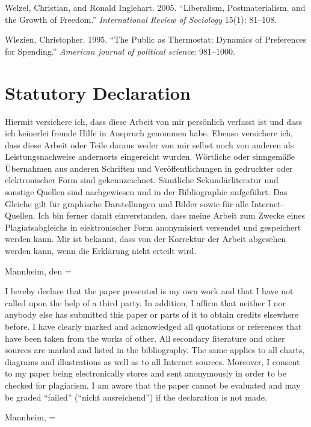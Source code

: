 \documentclass[12pt,english,a4paper,oneside]{article}
\newlength{\cslhangindent}
\newlength{\cslentryspacingunit} %
\newenvironment{CSLReferences}[2] %
 {%
  \setlength{\parindent}{0pt}
  \ifodd #1
  \let\oldpar\par
  \def\par{\hangindent=\cslhangindent\oldpar}
  \fi
  \setlength{\parskip}{#2\cslentryspacingunit}
 }%
 {}
\newcommand*{\SignatureAndDate}[1]{%
\vspace{2cm}
     Mannheim, den \makebox[2cm]{\hrulefill} \hfill\makebox[9cm]{\hrulefill}%
     \par
  \hfill\makebox[7.5cm][t]{Name und Unterschrift}
  \vspace{2cm}
}%
\newcommand*{\SignatureAndDateEng}[1]{%
\vspace{2cm}
     Mannheim, \makebox[2cm]{\hrulefill} \hfill\makebox[9cm]{\hrulefill}%
     \par
    \hfill\makebox[7.5cm][t]{Name and Signature}%
\vspace{2cm}
}%
\theoremstyle{definition}
\theoremstyle{definition}
\theoremstyle{definition}
\theoremstyle{definition}
\theoremstyle{remark}
\begin{document}
\begin{CSLReferences}{1}{0}
\leavevmode{}%
Welzel, Christian, and Ronald Inglehart. 2005. {``Liberalism, Postmaterialism, and the Growth of Freedom.''} \emph{International Review of Sociology} 15(1): 81--108.

\leavevmode{}%
Wlezien, Christopher. 1995. {``The Public as Thermostat: Dynamics of Preferences for Spending.''} \emph{American journal of political science}: 981--1000.

\end{CSLReferences}

\clearpage

\hypertarget{statutory-declaration}{%
\section*{Statutory Declaration}\label{statutory-declaration}}

Hiermit versichere ich, dass diese Arbeit von mir persönlich verfasst ist und dass ich keinerlei fremde Hilfe in Anspruch genommen habe.
Ebenso versichere ich, dass diese Arbeit oder Teile daraus weder von mir selbst noch von anderen als Leistungsnachweise andernorts eingereicht wurden.
Wörtliche oder sinngemäße Übernahmen aus anderen Schriften und Veröffentlichungen in gedruckter oder elektronischer Form sind gekennzeichnet.
Sämtliche Sekundärliteratur und sonstige Quellen sind nachgewiesen und in der Bibliographie aufgeführt.
Das Gleiche gilt für graphische Darstellungen und Bilder sowie für alle Internet-Quellen.
Ich bin ferner damit einverstanden, dass meine Arbeit zum Zwecke eines Plagiatsabgleichs in elektronischer Form anonymisiert versendet und gespeichert werden kann.
Mir ist bekannt, dass von der Korrektur der Arbeit abgesehen werden kann, wenn die Erklärung nicht erteilt wird.

\SignatureAndDate{}
\renewcommand*{\thepage}{ }

\noindent I hereby declare that the paper presented is my own work and that I have not called upon the help of a third party.
In addition, I affirm that neither I nor anybody else has submitted this paper or parts of it to obtain credits elsewhere before.
I have clearly marked and acknowledged all quotations or references that have been taken from the works of other.
All secondary literature and other sources are marked and listed in the bibliography.
The same applies to all charts, diagrams and illustrations as well as to all Internet sources.
Moreover, I consent to my paper being electronically stores and sent anonymously in order to be checked for plagiarism.
I am aware that the paper cannot be evaluated and may be graded \enquote{failed} (\enquote{nicht ausreichend}) if the declaration is not made.

\SignatureAndDateEng{}

\end{document}
